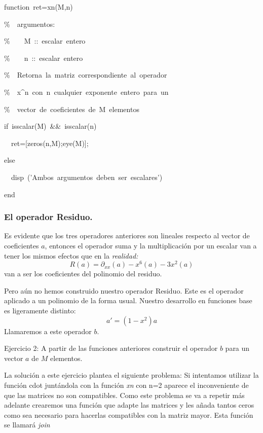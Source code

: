 \begin{lyxcode}
function~ret=xn(M,n)



\%~~argumentos:

\%~~~~M~::~escalar~entero

\%~~~~n~::~escalar~entero

\%~~Retorna~la~matriz~correspondiente~al~operador

\%~~x\textasciicircum{}n~con~n~cualquier~exponente~entero~para~un

\%~~vector~de~coeficientes~de~M~elementos



if~isscalar(M)~\&\&~isscalar(n)

~~ret={[}zeros(n,M);eye(M)];

else

~~disp~('Ambos~argumentos~deben~ser~escalares')

end
\end{lyxcode}
\lyxline{\normalsize}


\subsubsection{El operador Residuo.}

Es evidente que los tres operadores anteriores son lineales respecto
al vector de coeficientes $a$, entonces el operador suma y la multiplicación
por un escalar van a tener los mismos efectos que en la \emph{realidad:}\[
R(a)=\partial_{xx}(a)-x^{6}(a)-3x^{2}(a)\]
van a ser los coeficientes del polinomio del residuo.

Pero aún no hemos construido nuestro operador Residuo. Este es el
operador aplicado a un polinomio de la forma usual. Nuestro desarrollo
en funciones base es ligeramente distinto:\[
a'=(1-x^{2})a\]
Llamaremos a este operador $b$.

\lyxline{\normalsize}

Ejercicio 2: A partir de las funciones anteriores construir el operador
$b$ para un vector $a$ de $M$ elementos.

La solución a este ejercicio plantea el siguiente problema: Si intentamos
utilizar la función cdot juntándola con la función \emph{xn} con n=2
aparece el inconveniente de que las matrices no son compatibles. Como
este problema se va a repetir más adelante crearemos una función que
adapte las matrices y les añada tantos ceros como sea necesario para
hacerlas compatibles con la matriz mayor. Esta función se llamará
\emph{join}


